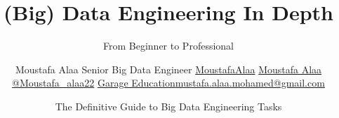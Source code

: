 \title[Data Engineering In Depth] %
{(Big) Data Engineering In Depth}

\subtitle{From Beginner to Professional}


\author[Moustafa Alaa] {
	Moustafa Alaa \newline Senior Big Data Engineer \newline 
	\faGithub \space \href{https://github.com/moustafaalaa/}{MoustafaAlaa}	
	\faLinkedin \space \href{https://www.linkedin.com/in/moustafa-alaa/}{Moustafa Alaa}
	\faTwitter \space \href{https://twitter.com/moustafa_alaa22}{@Moustafa\_alaa22} \newline
	\faYoutubePlay \space \href{https://youtube.com/c/GarageEducation}{Garage Education}\newline	\faEnvelope \space \href{mailto:mustafa.alaa.mohamed@gmail.com}{mustafa.alaa.mohamed@gmail.com} 
}


\date[\today] %
{The Definitive Guide to Big Data Engineering Tasks}



